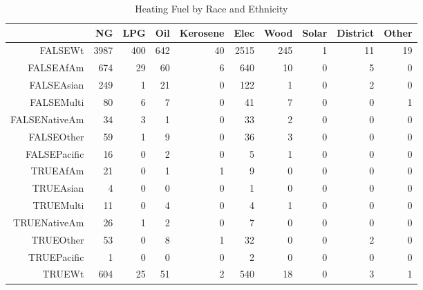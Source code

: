 \documentclass{article}
\begin{document}
\begin{table}[ht]
\centering
\begin{tabular}{rrrrrrrrrr}
  \hline
 & NG & LPG & Oil & Kerosene & Elec & Wood & Solar & District & Other \\ 
  \hline
FALSEWt & 3987 & 400 & 642 &  40 & 2515 & 245 &   1 &  11 &  19 \\ 
  FALSEAfAm & 674 &  29 &  60 &   6 & 640 &  10 &   0 &   5 &   0 \\ 
  FALSEAsian & 249 &   1 &  21 &   0 & 122 &   1 &   0 &   2 &   0 \\ 
  FALSEMulti &  80 &   6 &   7 &   0 &  41 &   7 &   0 &   0 &   1 \\ 
  FALSENativeAm &  34 &   3 &   1 &   0 &  33 &   2 &   0 &   0 &   0 \\ 
  FALSEOther &  59 &   1 &   9 &   0 &  36 &   3 &   0 &   0 &   0 \\ 
  FALSEPacific &  16 &   0 &   2 &   0 &   5 &   1 &   0 &   0 &   0 \\ 
  TRUEAfAm &  21 &   0 &   1 &   1 &   9 &   0 &   0 &   0 &   0 \\ 
  TRUEAsian &   4 &   0 &   0 &   0 &   1 &   0 &   0 &   0 &   0 \\ 
  TRUEMulti &  11 &   0 &   4 &   0 &   4 &   1 &   0 &   0 &   0 \\ 
  TRUENativeAm &  26 &   1 &   2 &   0 &   7 &   0 &   0 &   0 &   0 \\ 
  TRUEOther &  53 &   0 &   8 &   1 &  32 &   0 &   0 &   2 &   0 \\ 
  TRUEPacific &   1 &   0 &   0 &   0 &   2 &   0 &   0 &   0 &   0 \\ 
  TRUEWt & 604 &  25 &  51 &   2 & 540 &  18 &   0 &   3 &   1 \\ 
   \hline
\end{tabular}
\caption{Heating Fuel by Race and Ethnicity} 
\label{tab:HeatFuel}
\end{table}
\end{document}
